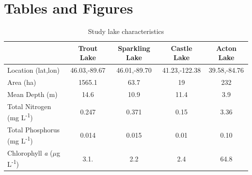 \documentclass[12pt, oneside]{article}
\begin{document}
\section*{Tables and Figures}
\begin{table}[h]
\begin{threeparttable}
\caption{Study lake characteristics}
\label{tab:table1}
\begin{tabular}{@{}lcccc@{}}
\toprule
                    & Trout Lake    & Sparkling Lake    & Castle Lake   & Acton Lake    \\ \midrule
Location (lat,lon)  & 46.03,-89.67  & 46.01,-89.70      & 41.23,-122.38 & 39.58,-84.76  \\
Area (ha)           & 1565.1        & 63.7              &  19           &    232        \\
Mean Depth (m)      & 14.6          &    10.9           &   11.4          &    3.9        \\
Total Nitrogen (mg L\textsuperscript{-1})           & 0.247 & 0.371 & 0.15    & 3.36        \\
Total Phosphorus (mg L\textsuperscript{-1})         & 0.014 & 0.015 & 0.01    & 0.10        \\
Chlorophyll \emph{a} ($\mu$g L\textsuperscript{-1}) & 3.1.  & 2.2   & 2.4    & 64.8        \\ \bottomrule
\end{tabular}
\end{threeparttable}
\end{table} %
\end{document}
